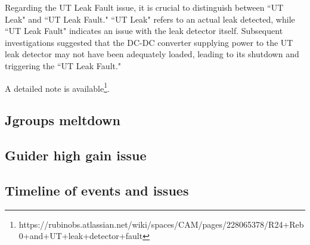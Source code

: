 Regarding the UT Leak Fault issue, it is crucial to distinguish between ``UT Leak" and ``UT Leak Fault." ``UT Leak" refers to an actual leak detected, while ``UT Leak Fault" indicates an issue with the leak detector itself. Subsequent investigations suggested that the DC-DC converter supplying power to the UT leak detector may not have been adequately loaded, leading to its shutdown and triggering the ``UT Leak Fault."

A detailed note is available\footnote{https://rubinobs.atlassian.net/wiki/spaces/CAM/pages/228065378/R24+Reb0+and+UT+leak+detector+fault}.

\subsection{Jgroups meltdown}

\subsection{Guider high gain issue}


\subsection{Timeline of events and issues}


